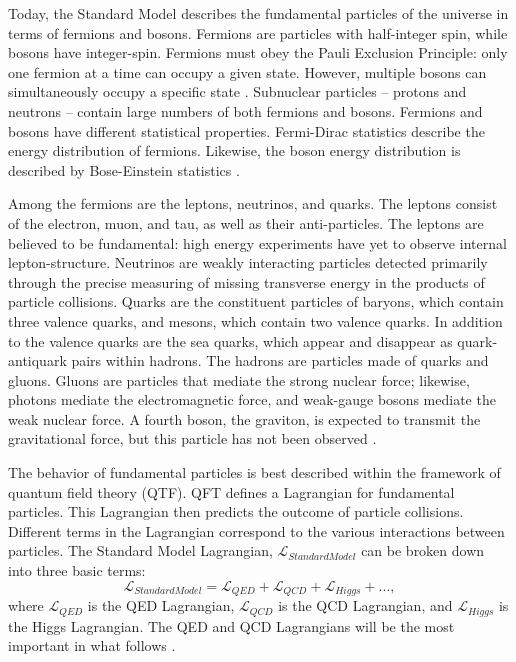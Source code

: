 Today, the Standard Model describes the fundamental particles of the universe in terms of fermions and bosons. Fermions are particles with half-integer spin, while bosons have integer-spin. Fermions must obey the Pauli Exclusion Principle: only one fermion at a time can occupy a given state. However, multiple bosons can simultaneously occupy a specific state \cite{Dyson:1967:SM}. Subnuclear particles -- protons and neutrons -- contain large numbers of both fermions and bosons. Fermions and bosons have different statistical properties. Fermi-Dirac statistics describe the energy distribution of fermions. Likewise, the boson energy distribution is described by Bose-Einstein statistics \cite{Huang_1987}. 

Among the fermions are the leptons, neutrinos, and quarks. The leptons consist of the electron, muon, and tau, as well as their anti-particles. The leptons are believed to be fundamental: high energy experiments have yet to observe internal lepton-structure. Neutrinos are weakly interacting particles detected primarily through the precise measuring of missing transverse energy in the products of particle collisions. Quarks are the constituent particles of baryons, which contain three valence quarks, and mesons, which contain two valence quarks. In addition to the valence quarks are the sea quarks, which appear and disappear as quark-antiquark pairs within hadrons. The hadrons are particles made of quarks and gluons. Gluons are particles that mediate the strong nuclear force; likewise, photons mediate the electromagnetic force, and weak-gauge bosons mediate the weak nuclear force. A fourth boson, the graviton, is expected to transmit the gravitational force, but this particle has not been observed \cite{Halzen:1984mc}. 

The behavior of fundamental particles is best described within the framework of quantum field theory (QTF). QFT defines a Lagrangian for fundamental particles. This Lagrangian then predicts the outcome of particle collisions. Different terms in the Lagrangian correspond to the various interactions between particles. The Standard Model Lagrangian, $\mathcal{L}_{Standard Model}$ can be broken down into three basic terms:	
\begin{equation}
\mathcal{L}_{Standard Model} = \mathcal{L}_{QED} + \mathcal{L}_{QCD} + \mathcal{L}_{Higgs} + ... ,  
\end{equation} 
where $\mathcal{L}_{QED}$ is the QED Lagrangian, $\mathcal{L}_{QCD}$ is the QCD Lagrangian, and $\mathcal{L}_{Higgs}$ is the Higgs Lagrangian. The QED and QCD Lagrangians will be the most important in what follows \cite{Halzen:1984mc}. 

